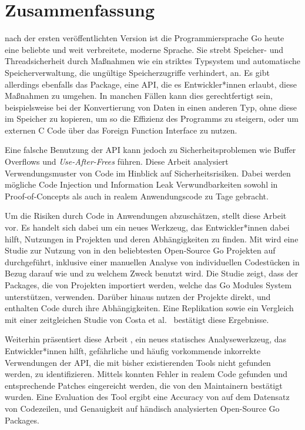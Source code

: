 \chapter*{Zusammenfassung}

 nach der ersten veröffentlichten Version ist die Programmiersprache Go heute eine beliebte und
weit verbreitete, moderne Sprache.
Sie strebt Speicher- und Threadsicherheit durch Maßnahmen wie ein striktes Typsystem und automatische
Speicherverwaltung, die ungültige Speicherzugriffe verhindert, an.
Es gibt allerdings ebenfalls das \unsafe{} Package, eine API, die es Entwickler*innen erlaubt, diese
Maßnahmen zu umgehen.
In manchen Fällen kann dies gerechtfertigt sein, beispielsweise bei der Konvertierung von Daten in einen anderen Typ,
ohne diese im Speicher zu kopieren, um so die Effizienz des Programms zu steigern, oder um externen C Code über das
Foreign Function Interface zu nutzen.

Eine falsche Benutzung der \unsafe{} API kann jedoch zu Sicherheitsproblemen wie Buffer Overflows und
\textit{Use-After-Frees} führen.
Diese Arbeit analysiert Verwendungsmuster von \unsafe{} Code im Hinblick auf Sicherheitsrisiken.
Dabei werden mögliche Code Injection und Information Leak Verwundbarkeiten sowohl in Proof-of-Concepts als auch in
realem Anwendungscode zu Tage gebracht.

Um die Risiken durch \unsafe{} Code in Anwendungen abzuschätzen, stellt diese Arbeit \toolGeiger{} vor.
Es handelt sich dabei um ein neues Werkzeug, das Entwickler*innen dabei hilft, \unsafe{} Nutzungen in Projekten und
deren Abhängigkeiten zu finden.
Mit \toolGeiger{} wird eine Studie zur Nutzung von \unsafe{} in den \projsTotal{} beliebtesten Open-Source Go Projekten
auf \github{} durchgeführt, inklusive einer manuellen Analyse von \numberLabeledCodeSnippets{} individuellen
Codestücken in Bezug darauf wie und zu welchem Zweck \unsafe{} benutzt wird.
Die Studie zeigt, dass \percentageUnsafePackages{} der Packages, die von Projekten importiert werden, welche das Go
Modules System unterstützen, \unsafe{} verwenden.
Darüber hinaus nutzen \percentageUnsafeProjects{} der Projekte \unsafe{} direkt, und
\percentageUnsafeTransitiveWithDependencies{} enthalten \unsafe{} Code durch ihre Abhängigkeiten.
Eine Replikation sowie ein Vergleich mit einer zeitgleichen Studie von Costa et al.~\cite{costa2020} bestätigt diese
Ergebnisse.

Weiterhin präsentiert diese Arbeit \toolSafer{}, ein neues statisches Analysewerkzeug, das Entwickler*innen hilft,
 gefährliche und häufig vorkommende inkorrekte Verwendungen der \unsafe{} \acrshort{API}, die mit bisher
existierenden Tools nicht gefunden werden, zu identifizieren.
Mittels \toolSafer{} konnten \numberBugsFixed{} Fehler in realem Code gefunden und entsprechende Patches eingereicht
werden, die von den Maintainern bestätigt wurden.
Eine Evaluation des Tool ergibt eine Accuracy von \goSaferEvaluationDatasetGosaferAccuracy{} auf dem Datensatz von
\unsafe{} Codezeilen, und \goSaferEvaluationPackagesGosaferAccuracy{} Genauigkeit auf händisch analysierten Open-Source
Go Packages.
